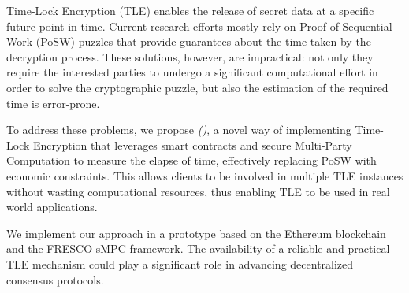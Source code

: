 Time-Lock Encryption (TLE) enables the release of secret data at a specific future point in time. %
%
Current research efforts mostly rely on Proof of Sequential Work (PoSW) puzzles that provide guarantees about the time taken by the decryption process.
%
These solutions, however, are  impractical: 
%
not only they require the interested parties to undergo a significant computational effort in order to solve the cryptographic puzzle, but also the estimation of the required time is error-prone.

To address these problems, we propose {\em \name (\shortname)}, a novel way of implementing Time-Lock Encryption that leverages smart contracts and secure Multi-Party Computation to measure the elapse of time, effectively replacing PoSW with economic constraints. 
%
%
This allows clients to be involved in multiple TLE instances without wasting computational resources, thus enabling TLE to be used in real world applications. 

We implement our approach in a prototype based on the Ethereum blockchain and the FRESCO sMPC framework.
%
The availability of a reliable and practical TLE mechanism could play a significant role in advancing decentralized consensus protocols. %

